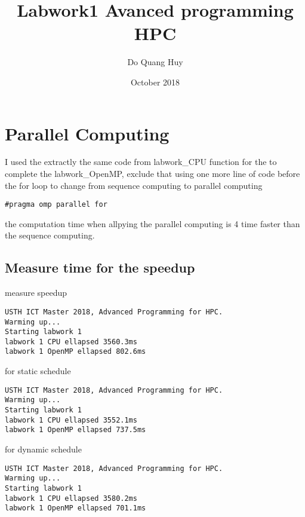 \documentclass{article}
\title{Labwork1 Avanced programming HPC}
\author{Do Quang Huy}
\date{October 2018}
\begin{document}
\maketitle

\section{Parallel Computing}
I used the extractly the same code from labwork\_CPU function for the to complete the labwork\_OpenMP, exclude that using one more line of code before the for loop to change from sequence computing to parallel computing 

\begin{verbatim}
#pragma omp parallel for
\end{verbatim}

the computation time when allpying the parallel computing is 4 time faster than the sequence computing.  

\subsection{Measure time for the speedup}
measure speedup
\begin{verbatim}
USTH ICT Master 2018, Advanced Programming for HPC.
Warming up...
Starting labwork 1
labwork 1 CPU ellapsed 3560.3ms
labwork 1 OpenMP ellapsed 802.6ms
\end{verbatim}


for static schedule
\begin{verbatim}
USTH ICT Master 2018, Advanced Programming for HPC.
Warming up...
Starting labwork 1
labwork 1 CPU ellapsed 3552.1ms
labwork 1 OpenMP ellapsed 737.5ms
\end{verbatim}

for dynamic schedule
\begin{verbatim}
USTH ICT Master 2018, Advanced Programming for HPC.
Warming up...
Starting labwork 1
labwork 1 CPU ellapsed 3580.2ms
labwork 1 OpenMP ellapsed 701.1ms
\end{verbatim}
\end{document}
